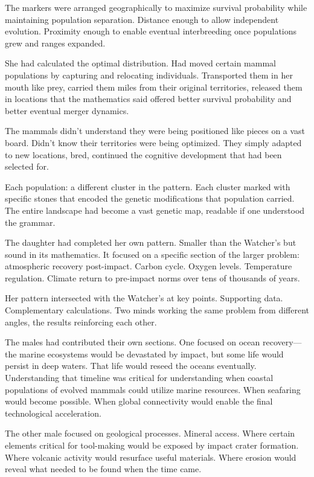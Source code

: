 The markers were arranged geographically to maximize survival probability while maintaining population separation. Distance enough to allow independent evolution. Proximity enough to enable eventual interbreeding once populations grew and ranges expanded.

She had calculated the optimal distribution. Had moved certain mammal populations by capturing and relocating individuals. Transported them in her mouth like prey, carried them miles from their original territories, released them in locations that the mathematics said offered better survival probability and better eventual merger dynamics.

The mammals didn't understand they were being positioned like pieces on a vast board. Didn't know their territories were being optimized. They simply adapted to new locations, bred, continued the cognitive development that had been selected for.

Each population: a different cluster in the pattern. Each cluster marked with specific stones that encoded the genetic modifications that population carried. The entire landscape had become a vast genetic map, readable if one understood the grammar.

\scenebreak

The daughter had completed her own pattern. Smaller than the Watcher's but sound in its mathematics. It focused on a specific section of the larger problem: atmospheric recovery post-impact. Carbon cycle. Oxygen levels. Temperature regulation. Climate return to pre-impact norms over tens of thousands of years.

Her pattern intersected with the Watcher's at key points. Supporting data. Complementary calculations. Two minds working the same problem from different angles, the results reinforcing each other.

The males had contributed their own sections. One focused on ocean recovery—the marine ecosystems would be devastated by impact, but some life would persist in deep waters. That life would reseed the oceans eventually. Understanding that timeline was critical for understanding when coastal populations of evolved mammals could utilize marine resources. When seafaring would become possible. When global connectivity would enable the final technological acceleration.

The other male focused on geological processes. Mineral access. Where certain elements critical for tool-making would be exposed by impact crater formation. Where volcanic activity would resurface useful materials. Where erosion would reveal what needed to be found when the time came.

